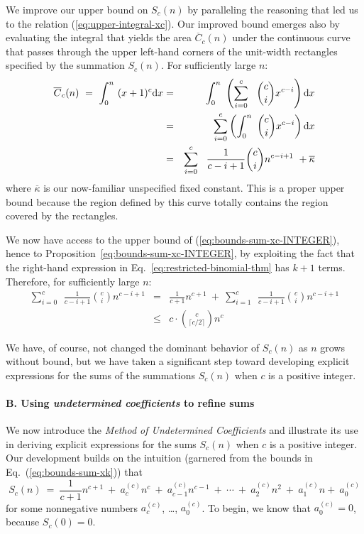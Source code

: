 We improve our upper bound on $S_c(n)$ by paralleling the reasoning that led us to the relation (\ref{eq:upper-integral-xc}).  Our improved bound emerges also by evaluating the integral that
yields the area $\overline{C}_c(n)$ under the continuous curve that passes through the upper left-hand corners of the unit-width rectangles specified by the summation $S_c(n)$.  For sufficiently large $n$:
\begin{eqnarray}
\nonumber
\overline{C}_c(n) \ = \
\int_0^n \ (x+1)^c {\rm d}x & = &
\int_0^n \ \left(\sum_{i=0}^c \ \ {c \choose i} x^{c-i} \right) {\rm d}x \\
\nonumber
& = &
\sum_{i=0}^c \left( \int_0^n \  {c \choose i} x^{c-i} \right) {\rm d}x \\
\label{eq:upper-integral-xk}
  & = &
\sum_{i=0}^c \ \ \frac{1}{c-i+1} {c \choose i} n^{c-i+1} \ + \overline{\kappa}
\end{eqnarray}
where $\overline{\kappa}$ is our now-familiar unspecified fixed constant.  This is a proper upper bound because the region defined by this curve totally contains the region covered by the rectangles.

\smallskip

We now have access to the upper bound of (\ref{eq:bounds-sum-xc-INTEGER}), hence to Proposition~\ref{eq:bounds-sum-xc-INTEGER}, by exploiting the fact that the right-hand expression in Eq.~\ref{eq:restricted-binomial-thm} has $k+1$ terms.  Therefore, for sufficiently large $n$:
\begin{eqnarray}
\nonumber
\sum_{i=0}^c \ \ \frac{1}{c-i+1} {c \choose i} n^{c-i+1}
  & = & 
\frac{1}{c+1} n^{c+1} \ + \ \sum_{i=1}^c \ \ \frac{1}{c-i+1} {c \choose i} n^{c-i+1} \\
\label{eq:bounds-sum-xk}
  & \leq & c \cdot {c \choose \lceil c/2 \rceil} n^c
\end{eqnarray}

\smallskip

We have, of course, not changed the dominant behavior of $S_c(n)$ as $n$ grows without bound, but we have taken a significant step toward developing explicit expressions for the sums of the summations $S_c(n)$ when $c$ is a positive integer.

\paragraph{B. Using {\em undetermined coefficients} to refine sums}

We now introduce the {\em Method of Undetermined Coefficients} and
illustrate its use in deriving explicit expressions for the sums
$S_c(n)$ when $c$ is a positive integer.  Our development builds on
the intuition (garnered from the bounds in Eq.~(\ref{eq:bounds-sum-xk})) that
\[ S_c(n) \ = \ \frac{1}{c+1} n^{c+1} \ + \ a^{(c)}_c n^c \ + \
a^{(c)}_{c-1} n^{c-1} \ + \ \cdots \ + \ a^{(c)}_2 n^2 \ + \ a^{(c)}_1 n
 + \ a^{(c)}_0
\]
for some nonnegative numbers $a^{(c)}_c$, \ldots, $a^{(c)}_0$.  To begin, we know that $a^{(c)}_0 = 0$, because $S_c(0) = 0$.

